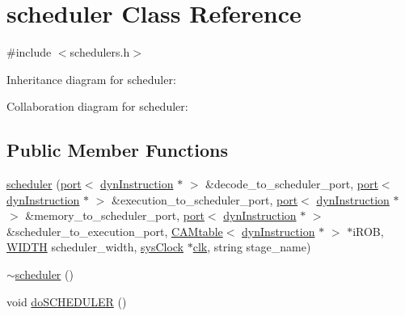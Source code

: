 \hypertarget{classscheduler}{
\section{scheduler Class Reference}
\label{classscheduler}
}


{\ttfamily \#include $<$schedulers.h$>$}



Inheritance diagram for scheduler:


Collaboration diagram for scheduler:
\subsection*{Public Member Functions}
\begin{DoxyCompactItemize}
\item 
\hyperlink{classscheduler_a68dfbdb71ea0d6ede1229f20536a5485}{scheduler} (\hyperlink{classport}{port}$<$ \hyperlink{classdynInstruction}{dynInstruction} $\ast$ $>$ \&decode\_\-to\_\-scheduler\_\-port, \hyperlink{classport}{port}$<$ \hyperlink{classdynInstruction}{dynInstruction} $\ast$ $>$ \&execution\_\-to\_\-scheduler\_\-port, \hyperlink{classport}{port}$<$ \hyperlink{classdynInstruction}{dynInstruction} $\ast$ $>$ \&memory\_\-to\_\-scheduler\_\-port, \hyperlink{classport}{port}$<$ \hyperlink{classdynInstruction}{dynInstruction} $\ast$ $>$ \&scheduler\_\-to\_\-execution\_\-port, \hyperlink{classCAMtable}{CAMtable}$<$ \hyperlink{classdynInstruction}{dynInstruction} $\ast$ $>$ $\ast$iROB, \hyperlink{global_2global_8h_a6fa2e24b8a418fa215e183264cbea3aa}{WIDTH} scheduler\_\-width, \hyperlink{classsysClock}{sysClock} $\ast$\hyperlink{g__objs_8h_afc4784c140eed1743728e83840e91c12}{clk}, string stage\_\-name)
\item 
\hyperlink{classscheduler_a4a0e4c12027ab0a23d8aa9e6d9e87ae0}{$\sim$scheduler} ()
\item 
void \hyperlink{classscheduler_a9d66babacf114134d5511492c5cbdc18}{doSCHEDULER} ()
\end{DoxyCompactItemize}


